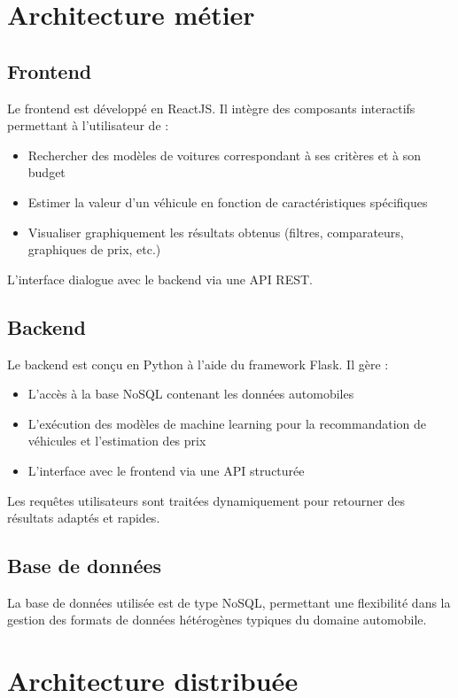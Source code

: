 \documentclass[12pt]{report}
\begin{document}
\chapter{Architecture métier}
\section{Frontend}
Le frontend est développé en ReactJS. Il intègre des composants interactifs permettant à l’utilisateur de :

\begin{itemize}
    \item Rechercher des modèles de voitures correspondant à ses critères et à son budget
    \item Estimer la valeur d’un véhicule en fonction de caractéristiques spécifiques
    \item Visualiser graphiquement les résultats obtenus (filtres, comparateurs, graphiques de prix, etc.)
\end{itemize}

L’interface dialogue avec le backend via une API REST.


\section{Backend}
Le backend est conçu en Python à l’aide du framework Flask. Il gère :

\begin{itemize}
    \item L’accès à la base NoSQL contenant les données automobiles
    \item L’exécution des modèles de machine learning pour la recommandation de véhicules et l’estimation des prix
    \item L’interface avec le frontend via une API structurée
\end{itemize}

Les requêtes utilisateurs sont traitées dynamiquement pour retourner des résultats adaptés et rapides.


\section{Base de données}
La base de données utilisée est de type NoSQL, permettant une flexibilité dans la gestion des formats de données hétérogènes typiques du domaine automobile.

\chapter{Architecture distribuée}
\end{document}
